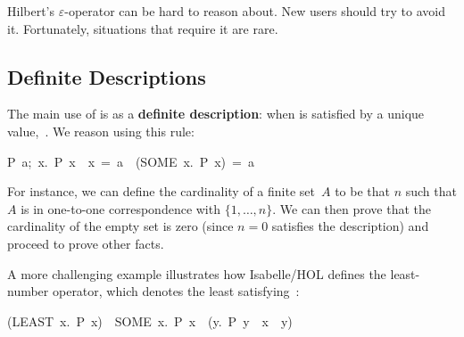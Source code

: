 \begin{warn}
Hilbert's $\varepsilon$-operator can be hard to reason about.  New users
should try to avoid it.  Fortunately, situations that require it are rare.
\end{warn}

\subsection{Definite Descriptions}

%
The main use of \hbox{} is as a \textbf{definite
description}: when  is satisfied by a unique value,~. 
We reason using this rule:
\begin{isabelle}
\isasymlbrakk P\ a;\ \isasymAnd x.\ P\ x\ \isasymLongrightarrow \ x\ =\ a\isasymrbrakk \ 
\isasymLongrightarrow \ (SOME\ x.\ P\ x)\ =\ a%
\end{isabelle}
For instance, we can define the
cardinality of a finite set~$A$ to be that
$n$ such that $A$ is in one-to-one correspondence with $\{1,\ldots,n\}$.  We can then
prove that the cardinality of the empty set is zero (since $n=0$ satisfies the
description) and proceed to prove other facts.

A more challenging example illustrates how Isabelle/HOL defines the least-number
operator, which denotes the least \isa{x} satisfying~\isa{P}:
\begin{isabelle}
(LEAST\ x.\ P\ x)\ \isasymequiv \ SOME\ x.\ P\ x\ \isasymand \ (\isasymforall y.\
P\ y\ \isasymlongrightarrow \ x\ \isasymle \ y)
\rulename{Least_def}
\end{isabelle}

